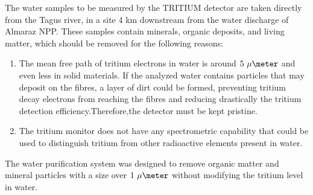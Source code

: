 The water samples to be measured by the TRITIUM detector are taken directly from the Tagus river, in a site 4 km downstream from the water discharge of Almaraz NPP. These samples contain minerals, organic deposits, and living matter, which should be removed for the following reasons:

\begin{enumerate}

\item{} The mean free path of tritium electrons in water is around $5~\mu\meter$ and even less in solid materials. If the analyzed water contains particles that may deposit on the fibres, a layer of dirt could be formed, preventing tritium decay electrons from reaching the fibres and reducing drastically the tritium detection efficiency.Therefore,the detector must be kept pristine.

\item{} The tritium monitor does not have any spectrometric capability that could be used to distinguish tritium from other radioactive elements present in water.

\end{enumerate}

The water purification system was designed to remove organic matter and mineral particles with a size over $1~\mu\meter$ without modifying the tritium level in water. 





